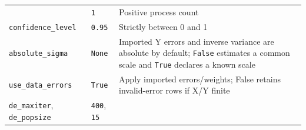 \documentclass[
  10pt,
  a4paper,
  oneside]{scrreprt}
\begin{document}
\begin{longtable}[]{@{}lll@{}}
\begin{minipage}[t]{0.30\columnwidth}
\end{minipage} & \begin{minipage}[t]{0.30\columnwidth}\raggedright
\texttt{1}\strut
\end{minipage} & \begin{minipage}[t]{0.30\columnwidth}\raggedright
Positive process count\strut
\end{minipage}\tabularnewline
\begin{minipage}[t]{0.30\columnwidth}\raggedright
\texttt{confidence\_level}\strut
\end{minipage} & \begin{minipage}[t]{0.30\columnwidth}\raggedright
\texttt{0.95}\strut
\end{minipage} & \begin{minipage}[t]{0.30\columnwidth}\raggedright
Strictly between 0 and 1\strut
\end{minipage}\tabularnewline
\begin{minipage}[t]{0.30\columnwidth}\raggedright
\texttt{absolute\_sigma}\strut
\end{minipage} & \begin{minipage}[t]{0.30\columnwidth}\raggedright
\texttt{None}\strut
\end{minipage} & \begin{minipage}[t]{0.30\columnwidth}\raggedright
Imported Y errors and inverse variance are absolute by default;
\texttt{False} estimates a common scale and \texttt{True} declares a
known scale\strut
\end{minipage}\tabularnewline
\begin{minipage}[t]{0.30\columnwidth}\raggedright
\texttt{use\_data\_errors}\strut
\end{minipage} & \begin{minipage}[t]{0.30\columnwidth}\raggedright
\texttt{True}\strut
\end{minipage} & \begin{minipage}[t]{0.30\columnwidth}\raggedright
Apply imported errors/weights; False retains invalid-error rows if X/Y
finite\strut
\end{minipage}\tabularnewline
\begin{minipage}[t]{0.30\columnwidth}\raggedright
\texttt{de\_maxiter}, \texttt{de\_popsize}\strut
\end{minipage} & \begin{minipage}[t]{0.30\columnwidth}\raggedright
\texttt{400}, \texttt{15}\strut
\end{minipage} & \begin{minipage}[t]{0.30\columnwidth}\raggedright

\end{minipage}
\end{longtable}
\end{document}
